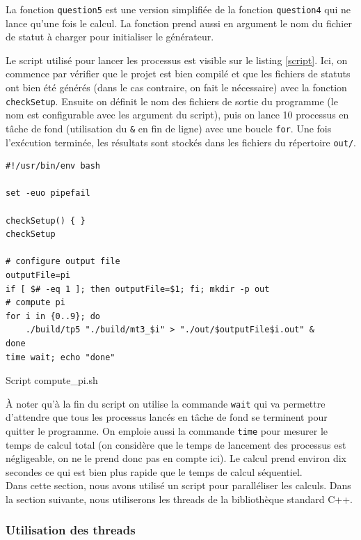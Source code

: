 \documentclass[a4paper]{article}
\begin{document}
La fonction \texttt{question5} est une version simplifiée de la fonction
\texttt{question4} qui ne lance qu'une fois le calcul. La fonction prend
aussi en argument le nom du fichier de statut à charger pour initialiser le
générateur.

Le script utilisé pour lancer les processus est visible sur le listing
\ref{script}. Ici, on commence par vérifier que le projet est bien compilé et
que les fichiers de statuts ont bien été générés (dans le cas contraire, on fait
le nécessaire) avec la fonction \texttt{checkSetup}. Ensuite on définit le
nom des fichiers de sortie du programme (le nom est configurable avec les
argument du script), puis on lance 10 processus en tâche de fond (utilisation du
\texttt{\&} en fin de ligne) avec une boucle \texttt{for}. Une fois
l'exécution terminée, les résultats sont stockés dans les fichiers du répertoire
\texttt{out/}.

\begin{listing}[ht!]
\begin{verbatim}
#!/usr/bin/env bash

set -euo pipefail

checkSetup() { }
checkSetup

# configure output file
outputFile=pi
if [ $# -eq 1 ]; then outputFile=$1; fi; mkdir -p out
# compute pi
for i in {0..9}; do
    ./build/tp5 "./build/mt3_$i" > "./out/$outputFile$i.out" &
done
time wait; echo "done"
\end{verbatim}
\caption{Script compute\_pi.sh}
\label{script}
\end{listing}

À noter qu'à la fin du script on utilise la commande \texttt{wait} qui va
permettre d'attendre que tous les processus lancés en tâche de fond se terminent
pour quitter le programme. On emploie aussi la commande \texttt{time} pour
mesurer le temps de calcul total (on considère que le temps de lancement des
processus est négligeable, on ne le prend donc pas en compte ici). Le calcul
prend environ dix secondes ce qui est bien plus rapide que le temps de calcul
séquentiel.\\

Dans cette section, nous avons utilisé un script pour paralléliser les calculs.
Dans la section suivante, nous utiliserons les threads de la bibliothèque
standard C++.

\subsubsection{Utilisation des threads}
\end{document}
